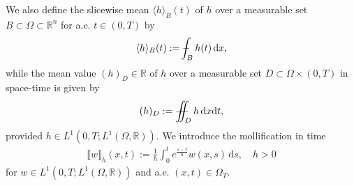 \documentclass[a4paper, 10pt, american]{amsart}
\numberwithin{theorem}{section}
\numberwithin{equation}{section}
\def\R{\mathbb{R}}
\newcommand{\dxdt}{\,\mathrm{d}x\mathrm{d}t}
\renewcommand{\d}{\,\mathrm{d}}
\newcommand{\dx}{\,\mathrm{d}x}
\def\Xint#1{\mathchoice
    {\XXint\displaystyle\textstyle{#1}}%
    {\XXint\textstyle\scriptstyle{#1}}%
    {\XXint\scriptstyle\scriptscriptstyle{#1}}%
    {\XXint\scriptscriptstyle\scriptscriptstyle{#1}}%
    \!\int}
\def\XXint#1#2#3{\setbox0=\hbox{$#1{#2#3}{\int}$}
    \vcenter{\hbox{$#2#3$}}\kern-0.5\wd0}
\def\bint{\Xint-}
\def\Xiint#1{\mathchoice
    {\XXiint\displaystyle\textstyle{#1}}%
    {\XXiint\textstyle\scriptstyle{#1}}%
    {\XXiint\scriptstyle\scriptscriptstyle{#1}}%
    {\XXiint\scriptscriptstyle\scriptscriptstyle{#1}}%
    \!\iint}
\def\XXiint#1#2#3{\setbox0=\hbox{$#1{#2#3}{\iint}$}
    \vcenter{\hbox{$#2#3$}}\kern-0.5\wd0}
\def\biint{\Xiint{-\!-}}
\def\<{\langle}
\def\>{\rangle}
\begin{document}
We also define the slicewise mean  $\<h\>_B(t)$ of $h$ over a
measurable set $B\subset\Omega\subset\R^n$ for a.e. $t\in(0,T)$ by
\begin{equation}\label{slice-mean}
	\<h\>_{B}(t)
	:=
	\bint_{B} h(t)\dx,
\end{equation}
while  the mean value $(h)_{D}\in \R$ of $h$ over a measurable set
$D\subset\Omega\times(0,T)$ in space-time is given by
\begin{equation*}
	(h)_{D}
	:=
	\biint_{D} h \dxdt,
\end{equation*}
provided $h\in L^1(0,T;L^1(\Omega,\R))$.
We introduce the mollification in time 
\begin{align}\label{time-molli}
\llbracket w \rrbracket_h(x,t):=\frac1h\int_0^t e^\frac{s-t}h w(x,s)\d s,
\quad h>0
\end{align}
for $w\in L^1(0,T;L^1(\Omega,\R))$ and a.e. $(x,t)\in\Omega_T$.
\end{document}
